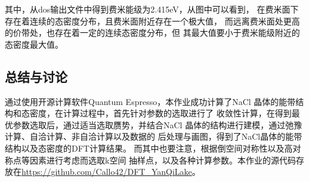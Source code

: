 \documentclass[UTF8]{ctexart}
\numberwithin{figure}{section}  %
\numberwithin{table}{section}
\numberwithin{equation}{section}
\begin{document}
            其中，从dos输出文件中得到费米能级为2.415eV，从图中可以看到，
        在费米面下存在着连续的态密度分布，且费米面附近存在一个极大值，
        而远离费米面处更高的价带处，也存在着一定的连续态密度分布，但
        其最大值要小于费米能级附近的态密度最大值。

    \subsection{总结与讨论}
        通过使用开源计算软件Quantum Espresso，本作业成功计算了NaCl
    晶体的能带结构和态密度，在计算过程中，首先针对参数的选取进行了
    收敛性计算，在得到最优参数选取后，通过适当选取赝势，并结合NaCl
    晶体的结构进行建模，通过弛豫计算、自洽计算、非自洽计算以及数据的
    后处理与画图，得到了NaCl晶体的能带结构以及态密度的DFT计算结果。
    而其中也要注意，根据倒空间对称性以及高对称点等因素进行考虑而选取k空间
    抽样点，以及各种计算参数。本作业的源代码存放在\url{https://github.com/Callo42/DFT_YanQiLake}。
   
\end{document}
